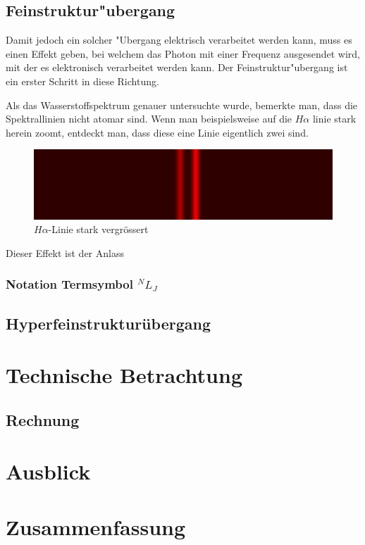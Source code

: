 \begin{refsection}
% 


\subsection{Feinstruktur"ubergang}
Damit jedoch ein solcher "Ubergang elektrisch verarbeitet werden kann, muss es einen Effekt geben, bei welchem das Photon mit einer Frequenz ausgesendet wird, mit der es elektronisch verarbeitet werden kann.
Der Feinstruktur"ubergang ist ein erster Schritt in diese Richtung. 

Als das Wasserstoffspektrum genauer untersuchte wurde, bemerkte man, dass die Spektrallinien nicht atomar sind. Wenn man beispielsweise auf die $H\alpha$ linie stark herein zoomt, entdeckt man, dass diese eine Linie eigentlich zwei sind. 

\begin{figure}[h!]
	\centering
	\includegraphics[width = .6\columnwidth]{../vortrag/pictures/fine_structure_hydrogen.png}
	\caption{$H\alpha$-Linie stark vergrössert} %
\end{figure}

Dieser Effekt ist der Anlass

\subsubsection{Notation Termsymbol $^N L _J$}

\subsection{Hyperfeinstrukturübergang}

\section{Technische Betrachtung}

\subsection{Rechnung}

\section{Ausblick} 

\section{Zusammenfassung}

\printbibliography[heading=subbibliography]
\end{refsection}

